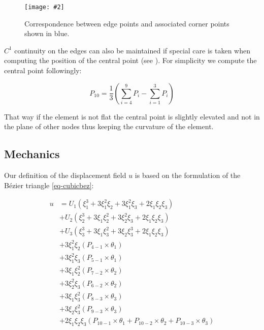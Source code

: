 \documentclass{egpubl}
\newcommand{\Figure}[3]{%
\begin{figure}[htb]
  \centering
  \texttt{[image: \#2]}
  \caption{\label{fig-#2}#3}
\end{figure}}
\begin{document}
\Figure{0.8\linewidth}{segments}
{Correspondence between edge points and associated corner points shown in
blue.}

$C^1$ continuity on the edges can also be maintained if special care is taken
when computing the position of the central point (see \cite{Ubach2010}). For
simplicity we compute the central point followingly:

\begin{equation}\label{eq-central}
    P_{10} = \frac{1}{3}(\sum_{i=4}^9 P_i - \sum_{i=1}^3 P_i)
\end{equation}


That way if the element is not flat the central point is slightly elevated
and not in the plane of other nodes thus keeping the curvature of the
element.



\subsection{Mechanics} %

Our definition of the displacement field $u$ is based on the formulation of the
Bézier triangle \eqref{eq-cubicbez}:

\begin{equation}\label{eq-bezU}
\begin{split}
  u & = U_1 ( \xi_1^3 + 3 \xi_1^2 \xi_2 + 3 \xi_1^2 \xi_3
        + 2 \xi_1 \xi_2 \xi_3 ) \\
    & + U_2 ( \xi_2^3 + 3 \xi_1 \xi_2^2 + 3 \xi_2^2 \xi_3
        + 2 \xi_1 \xi_2 \xi_3 ) \\
    & + U_3 ( \xi_3^3 + 3 \xi_1 \xi_3^2 + 3 \xi_2 \xi_3^3
        + 2 \xi_1 \xi_2 \xi_3 ) \\
    & + 3 \xi_1^2 \xi_2 (P_{4-1} \times \theta_1) \\
    & + 3 \xi_1^2 \xi_3 (P_{5-1} \times \theta_1) \\
    & + 3 \xi_1 \xi_2^2 (P_{7-2} \times \theta_2) \\
    & + 3 \xi_2^2 \xi_3 (P_{6-2} \times \theta_2) \\
    & + 3 \xi_1 \xi_3^2 (P_{8-3} \times \theta_3) \\
    & + 3 \xi_2 \xi_3^2 (P_{9-3} \times \theta_3) \\
    & + 2 \xi_1 \xi_2 \xi_3 (P_{10-1} \times \theta_1 +
        P_{10-2} \times \theta_2 +
        P_{10-3} \times \theta_3)
\end{split}
\end{equation}
\end{document}
